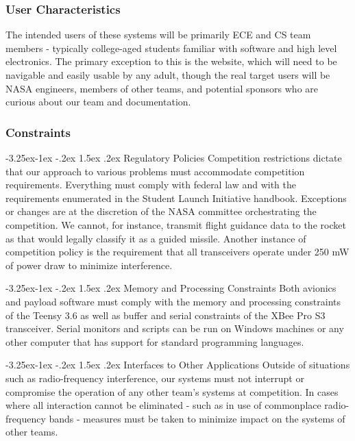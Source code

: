 \documentclass[onecolumn, draftclsnofoot, 10pt, compsoc]{IEEEtran}
\makeatletter
\renewcommand\paragraph{\@startsection{paragraph}{4}{\z@}%
                                     {-3.25ex\@plus -1ex \@minus -.2ex}%
                                     {1.5ex \@plus .2ex}%
                                     {\normalfont\normalsize\bfseries}}
\makeatother
\begin{document}
\subsubsection{User Characteristics}
The intended users of these systems will be primarily ECE and CS team members - typically college-aged students familiar with software and high level electronics. The primary exception to this is the website, which will need to be navigable and easily usable by any adult, though the real target users will be NASA engineers, members of other teams, and potential sponsors who are curious about our team and documentation.

\subsubsection{Constraints}
\paragraph{Regulatory Policies}
Competition restrictions dictate that our approach to various problems must accommodate competition requirements. Everything must comply with federal law and with the requirements enumerated in the Student Launch Initiative handbook. Exceptions or changes are at the discretion of the NASA committee orchestrating the competition. We cannot, for instance, transmit flight guidance data to the rocket as that would legally classify it as a guided missile. Another instance of competition policy is the requirement that all transceivers operate under 250 mW of power draw to minimize interference.

\paragraph{Memory and Processing Constraints}
Both avionics and payload software must comply with the memory and processing constraints of the Teensy 3.6 as well as buffer and serial constraints of the XBee Pro S3 transceiver. Serial monitors and scripts can be run on Windows machines or any other computer that has support for standard programming languages.

\paragraph{Interfaces to Other Applications}
Outside of situations such as radio-frequency interference, our systems must not interrupt or compromise the operation of any other team's systems at competition. In cases where all interaction cannot be eliminated - such as in use of commonplace radio-frequency bands - measures must be taken to minimize impact on the systems of other teams.
\end{document}
